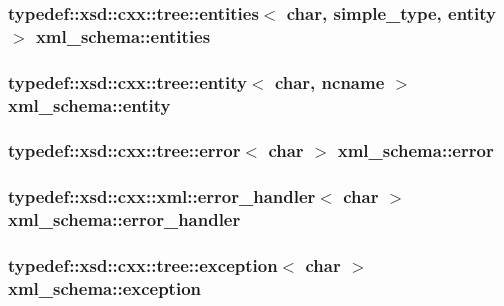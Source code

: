 \subsubsection[{\texorpdfstring{entities}{entities}}]{\setlength{\rightskip}{0pt plus 5cm}typedef\+::xsd\+::cxx\+::tree\+::entities$<$ char, {\bf simple\+\_\+type}, {\bf entity} $>$ {\bf xml\+\_\+schema\+::entities}}\hypertarget{namespacexml__schema_a27645dad916b7c154cfa441c84cfb8f8}{}\label{namespacexml__schema_a27645dad916b7c154cfa441c84cfb8f8}
\subsubsection[{\texorpdfstring{entity}{entity}}]{\setlength{\rightskip}{0pt plus 5cm}typedef\+::xsd\+::cxx\+::tree\+::entity$<$ char, {\bf ncname} $>$ {\bf xml\+\_\+schema\+::entity}}\hypertarget{namespacexml__schema_acbf59a94b42e0d01cdfc56b93465912a}{}\label{namespacexml__schema_acbf59a94b42e0d01cdfc56b93465912a}
\subsubsection[{\texorpdfstring{error}{error}}]{\setlength{\rightskip}{0pt plus 5cm}typedef\+::xsd\+::cxx\+::tree\+::error$<$ char $>$ {\bf xml\+\_\+schema\+::error}}\hypertarget{namespacexml__schema_a25204746dcf5a00a92e68d214a894b84}{}\label{namespacexml__schema_a25204746dcf5a00a92e68d214a894b84}
\subsubsection[{\texorpdfstring{error\+\_\+handler}{error_handler}}]{\setlength{\rightskip}{0pt plus 5cm}typedef\+::xsd\+::cxx\+::xml\+::error\+\_\+handler$<$ char $>$ {\bf xml\+\_\+schema\+::error\+\_\+handler}}\hypertarget{namespacexml__schema_a0a5d9528e9175cedf199984a8bb64d62}{}\label{namespacexml__schema_a0a5d9528e9175cedf199984a8bb64d62}
\subsubsection[{\texorpdfstring{exception}{exception}}]{\setlength{\rightskip}{0pt plus 5cm}typedef\+::xsd\+::cxx\+::tree\+::exception$<$ char $>$ {\bf xml\+\_\+schema\+::exception}}\hypertarget{namespacexml__schema_a1e9265f27587f794fe1b02f5cefb447f}{}\label{namespacexml__schema_a1e9265f27587f794fe1b02f5cefb447f}
